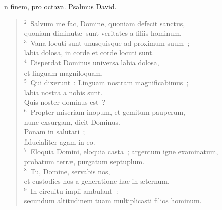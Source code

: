\bchapter
{}n finem, pro octava. Psalmus David.
\begin{flushleft}\begin{verse}\vspace{6pt}${}^{2}$~Salvum me fac, Domine, quoniam defecit sanctus,\\ quoniam diminut\ae\ sunt veritates a filiis hominum.\\
${}^{3}$~Vana locuti sunt unusquisque ad proximum suum~;\\ labia dolosa, in corde et corde locuti sunt.\\
${}^{4}$~Disperdat Dominus universa labia dolosa,\\ et linguam magniloquam.\\
${}^{5}$~Qui dixerunt~: Linguam nostram magnificabimus~;\\ labia nostra a nobis sunt.\\ Quis noster dominus est~?\\
${}^{6}$~Propter miseriam inopum, et gemitum pauperum,\\ nunc exsurgam, dicit Dominus.\\ Ponam in salutari~;\\ fiducialiter agam in eo.\\
${}^{7}$~Eloquia Domini, eloquia casta~; argentum igne examinatum,\\ probatum terr\ae , purgatum septuplum.\\
${}^{8}$~Tu, Domine, servabis nos,\\ et custodies nos a generatione hac in \ae ternum.\\
${}^{9}$~In circuitu impii ambulant~:\\ secundum altitudinem tuam multiplicasti filios hominum.\end{verse}\end{flushleft}



